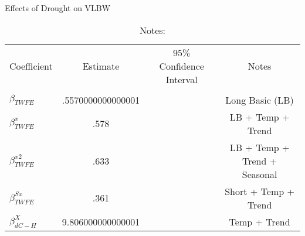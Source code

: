 \begin{table}[!ht]
\centering
\caption{Effects of Drought on VLBW}\label{tab:twfe_vlbw_test}
\fontsize{10pt}{12pt}\selectfont
\begin{tabular}{lccc}
\toprule
 \multicolumn{1}{c}{Coefficient}  &\multicolumn{1}{c}{Estimate}&\multicolumn{1}{c}{95\% Confidence Interval}&\multicolumn{1}{c}{Notes}\\\cmidrule(lr){2-2}\cmidrule(lr){3-3}\cmidrule(lr){4-4} \\
\midrule
 $ \beta_{TWFE} $ & .5570000000000001  & \left [ .017 ,  1.097  \right ] & Long Basic (LB) \\
 $ \beta^{x}_{TWFE} $ & .578  & \left [ .019 ,  1.137  \right ] & LB + Temp + Trend \\
 $ \beta^{x2}_{TWFE} $ & .633  & \left [ .056 ,  1.21  \right ] & LB + Temp + Trend + Seasonal \\
 $ \beta^{Sx}_{TWFE} $ & .361  & \left [ -.166 ,  .888  \right ] & Short + Temp + Trend \\
 $ \beta^{X}_{dC-H} $ & 9.806000000000001  & \left [ 1.832 ,  17.781  \right ] & Temp + Trend \\
\bottomrule
\end{tabular}
\caption*{\footnotesize{Notes:}}
\end{table}
